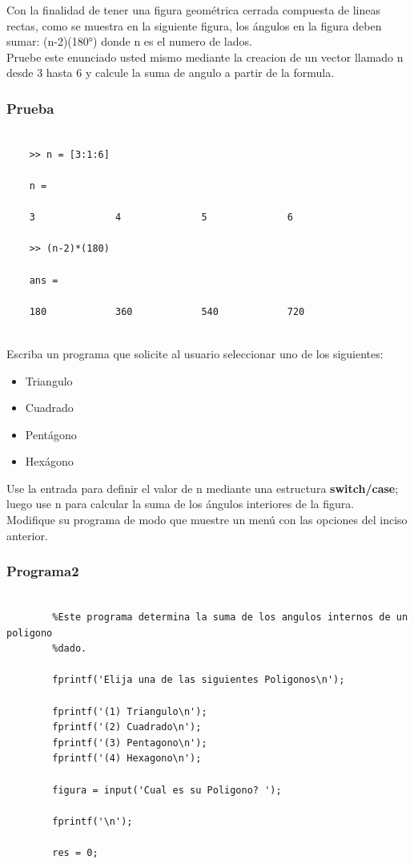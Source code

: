 \documentclass{article}
\begin{document}
	Con la finalidad de tener una figura geométrica cerrada compuesta de lineas rectas, como se muestra en la siguiente figura, los ángulos en la figura deben sumar: (n-2)(180°) donde n es el numero de lados.
	\\
	
	Pruebe este enunciado usted mismo mediante la creacion de un vector llamado n desde 3 hasta 6 y calcule la suma de angulo a partir de la formula.
	
	\subsubsection{Prueba}
	
	\begin{lstlisting}
	
	>> n = [3:1:6]
	
	n =
	
	3              4              5              6       
	
	>> (n-2)*(180)
	
	ans =
	
	180            360            540            720   
	
	\end{lstlisting}
	
	Escriba un programa que solicite al usuario seleccionar uno de los siguientes:
	
	\begin{itemize}
		\item Triangulo
		\item Cuadrado
		\item Pentágono
		\item Hexágono
	\end{itemize}
	
	Use la entrada para definir el valor de n mediante una estructura \textbf{switch/case}; luego use n para calcular la suma de los ángulos interiores de la figura.
	\\
	
	Modifique su programa de modo que muestre un menú con las opciones del inciso anterior.
	
	\subsubsection{Programa2}
	
	\begin{lstlisting}
		
		%Este programa determina la suma de los angulos internos de un poligono
		%dado.
		
		fprintf('Elija una de las siguientes Poligonos\n');
		
		fprintf('(1) Triangulo\n');
		fprintf('(2) Cuadrado\n');
		fprintf('(3) Pentagono\n');
		fprintf('(4) Hexagono\n');
		
		figura = input('Cual es su Poligono? ');
		
		fprintf('\n');
		
		res = 0;
	\end{lstlisting}
	
\end{document}
